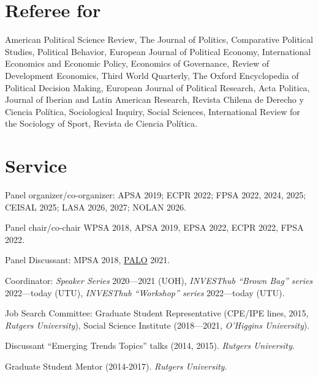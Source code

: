 \documentclass[letterpaper]{article}
\renewenvironment{itemize}{
  \begin{list}{}{
    \setlength{\leftmargin}{1.5em}
  }
}{
  \end{list}
}
\begin{document}
\section*{Referee for}

    American Political Science Review, The Journal of Politics, Comparative Political Studies, Political Behavior, European Journal of Political Economy, International Economics and Economic Policy, Economics of Governance, Review of Development Economics, Third World Quarterly, The Oxford Encyclopedia of Political Decision Making, European Journal of Political Research, Acta Politica, Journal of Iberian and Latin American Research, Revista Chilena de Derecho y Ciencia Pol\'itica, Sociological Inquiry, Social Sciences, International Review for the Sociology of Sport, Revista de Ciencia Pol\'itica.





\section*{Service}

\begin{itemize}
\item[\textcolor{gray}{\textbullet}] Panel organizer/co-organizer: APSA 2019; ECPR 2022; FPSA 2022, 2024, 2025; CEISAL 2025; LASA 2026, 2027; NOLAN 2026.
\item[\textcolor{gray}{\textbullet}] Panel chair/co-chair WPSA 2018, APSA 2019, EPSA 2022, ECPR 2022, FPSA 2022.
\item[\textcolor{gray}{\textbullet}] Panel Discussant: MPSA 2018, \href{https://paloresearch.fi/en/events/finalconference/}{PALO} 2021.
\item[\textcolor{gray}{\textbullet}] Coordinator: \emph{Speaker Series} 2020---2021 (UOH), \emph{INVESThub ``Brown Bag'' series} 2022---today (UTU), \emph{INVESThub ``Workshop'' series} 2022---today (UTU).
\item[\textcolor{gray}{\textbullet}] Job Search Committee: Graduate Student Representative (CPE/IPE lines, 2015, \emph{Rutgers University}), Social Science Institute (2018---2021, \emph{O'Higgins University}).
\item[\textcolor{gray}{\textbullet}] Discussant ``Emerging Trends Topics'' talks (2014, 2015). \emph{Rutgers University}.
\item[\textcolor{gray}{\textbullet}] Graduate Student Mentor (2014-2017). \emph{Rutgers University}.
\end{itemize}
\end{document}
